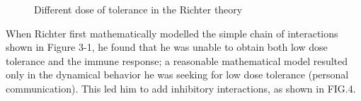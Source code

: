 \documentclass[Proceedings]{ascelike}
\begin{document}
\begin{figure}[!t]
\centering
{}
\caption{ Different dose of tolerance in the Richter theory}
\end{figure}
\par
When Richter first mathematically modelled the simple chain of interactions shown in Figure 3-1, he found that he was unable to obtain both low dose tolerance and the immune response; a reasonable mathematical model resulted only in the dynamical behavior he was seeking for low dose tolerance (personal communication). This led him to add inhibitory interactions, as shown in FIG.4.
\end{document}

